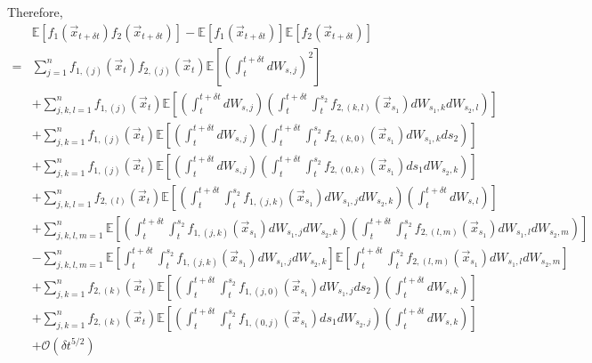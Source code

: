 \documentclass[12pt]{article}
\begin{document}
Therefore, 
%
\begin{equation}
\begin{aligned}
&\mathbb{E} \left[ f_1(\vec{x}_{t + \delta t}) f_2(\vec{x}_{t + \delta t}) \right] 
- \mathbb{E} \left[ f_1(\vec{x}_{t + \delta t}) \right] \mathbb{E} \left[ f_2(\vec{x}_{t + \delta t}) \right] \\
=& 
 \sum_{j=1}^n f_{1,(j)}(\vec{x}_t) f_{2,(j)}(\vec{x}_t) \mathbb{E} \left[ \left( \int_t^{t + \delta t} dW_{s,j} \right)^2 \right] \\
&+ \sum_{j,k,l=1}^n f_{1,(j)}(\vec{x}_t) \mathbb{E} \left[ \left( \int_t^{t + \delta t} dW_{s,j} \right) \left( \int_t^{t+\delta t} \int_t^{s_2} f_{2,(k,l)}(\vec{x}_{s_1}) dW_{s_1, k} dW_{s_2, l} \right) \right] \\
&+ \sum_{j,k=1}^n f_{1,(j)}(\vec{x}_t) \mathbb{E} \left[ \left( \int_t^{t + \delta t} dW_{s,j} \right)\left( \int_t^{t+\delta t} \int_t^{s_2} f_{2,(k,0)}(\vec{x}_{s_1}) dW_{s_1, k} ds_2 \right) \right]\\
&+ \sum_{j, k=1}^n f_{1,(j)}(\vec{x}_t) \mathbb{E} \left[ \left( \int_t^{t + \delta t} dW_{s,j} \right) \left( \int_t^{t+\delta t} \int_t^{s_2} f_{2,(0,k)}(\vec{x}_{s_1}) ds_1 dW_{s_2, k} \right) \right] \\
&+  \sum_{j, k, l=1}^n  f_{2,(l)}(\vec{x}_t)\mathbb{E} \left[ \left( \int_t^{t+\delta t} \int_t^{s_2} f_{1,(j,k)}(\vec{x}_{s_1}) dW_{s_1, j} dW_{s_2, k} \right) \left( \int_t^{t + \delta t} dW_{s,l} \right) \right] \\
&+ \sum_{j, k, l, m=1}^n \mathbb{E} \left[ \left( \int_t^{t+\delta t} \int_t^{s_2} f_{1,(j,k)}(\vec{x}_{s_1}) dW_{s_1, j} dW_{s_2, k} \right) \left( \int_t^{t+\delta t} \int_t^{s_2} f_{2,(l,m)}(\vec{x}_{s_1}) dW_{s_1, l} dW_{s_2, m} \right) \right] \\
&- \sum_{j, k, l, m =1}^n \mathbb{E} \left[ \int_t^{t+\delta t} \int_t^{s_2} f_{1,(j,k)}(\vec{x}_{s_1}) dW_{s_1, j} dW_{s_2, k} \right] \mathbb{E} \left[ \int_t^{t+\delta t} \int_t^{s_2} f_{2,(l,m)}(\vec{x}_{s_1}) dW_{s_1, l} dW_{s_2, m} \right] \\
&+  \sum_{j, k=1}^n f_{2,(k)}(\vec{x}_t) \mathbb{E} \left[ \left( \int_t^{t+\delta t} \int_t^{s_2} f_{1,(j,0)}(\vec{x}_{s_1}) dW_{s_1, j} ds_2  \right) \left( \int_t^{t + \delta t} dW_{s,k} \right) \right]\\
&+   \sum_{j, k=1}^n  f_{2,(k)}(\vec{x}_t) \mathbb{E} \left[ \left( \int_t^{t+\delta t} \int_t^{s_2} f_{1,(0,j)}(\vec{x}_{s_1}) ds_1 dW_{s_2, j}  \right) \left(\int_t^{t + \delta t} dW_{s,k} \right) \right] \\
&+ \mathcal{O} (\delta t^{5/2})
\end{aligned}
\end{equation}
\end{document}
